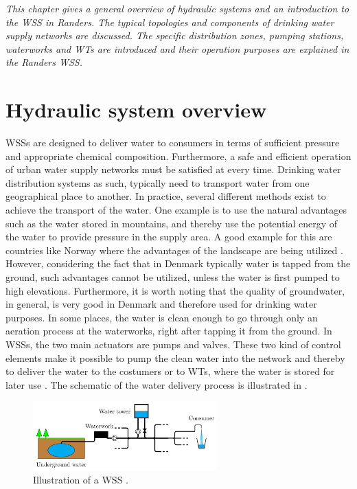 \emph{This chapter gives a general overview of hydraulic systems and an introduction to the WSS in Randers. The typical topologies and components of drinking water supply networks are discussed. The specific distribution zones, pumping stations, waterworks and WTs are introduced and their operation purposes are explained in the Randers WSS.}

\section{Hydraulic system overview}
\label{hydraulic_system_overview}

WSSs are designed to deliver water to consumers in terms of sufficient pressure and appropriate chemical composition. Furthermore, a safe and efficient operation of urban water supply networks must be satisfied at every time. Drinking water distribution systems as such, typically need to transport water from one geographical place to another. In practice, several different methods exist to achieve the transport of the water. One example is to use the natural advantages such as the water stored in mountains, and thereby use the potential energy of the water to provide pressure in the supply area. A good example for this are countries like Norway where the advantages of the landscape are being utilized \cite{norway_mountains}. However, considering the fact that in Denmark typically water is tapped from the ground, such advantages cannot be utilized, unless the water is first pumped to high elevations. Furthermore, it is worth noting that the quality of groundwater, in general, is very good in Denmark and therefore used for drinking water purposes. In some places, the water is clean enough to go through only an aeration process at the waterworks, right after tapping it from the ground. In WSSs, the two main actuators are pumps and valves. These two kind of control elements make it possible to pump the clean water into the network and thereby to deliver the water to the costumers or to WTs, where the water is stored for later use \cite{prahata}. The schematic of the water delivery process is illustrated in .

\begin{figure}[H]
\centering
\includegraphics[width=0.63\textwidth]{report/pictures/WSS_illustration}
\caption{Illustration of a WSS \cite{kenneth_houe}.}
\label{fig:WSS_example}
\end{figure}

